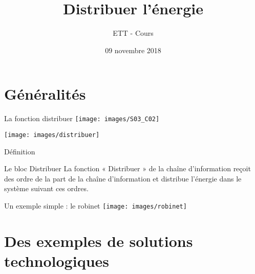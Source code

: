 \documentclass{beamer}
\title{Distribuer l'énergie}
\subtitle{}
\author{ETT - Cours}
\institute{IUT de Cachan}
\date{09 novembre 2018}
\begin{document}
    \begin{frame}
        \maketitle
    \end{frame}

    \begin{frame}
        \tableofcontents
    \end{frame}

    \section{Généralités}
    \begin{frame}{La fonction distribuer}
      \centering
      \texttt{[image: images/S03\_C02]}
    \end{frame}

    \begin{frame}{}
      \centering
      \texttt{[image: images/distribuer]}
    \end{frame}

    \begin{frame}{Définition}
      \begin{alertblock}{Le bloc Distribuer}
        La fonction « Distribuer » de la chaîne d'information reçoit des ordre de la part de la chaîne d'information et distribue l'énergie dans le système suivant ces ordres.
      \end{alertblock}

    \end{frame}

    \begin{frame}{Un exemple simple : le robinet}
      \centering
      \texttt{[image: images/robinet]}
    \end{frame}


\section{Des exemples de solutions technologiques}
\end{document}
